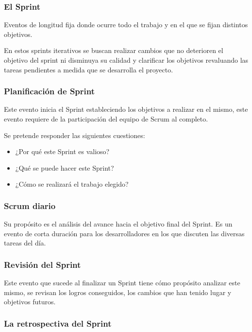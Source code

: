 \subsubsection{El Sprint}

Eventos de longitud fija donde ocurre todo el trabajo y en el que se fijan distintos objetivos.

En estos sprints iterativos se buscan realizar cambios que no deterioren el objetivo del sprint ni disminuya su calidad y clarificar los objetivos revaluando las tareas pendientes a medida que se desarrolla el proyecto.

\subsubsection{Planificación de Sprint}

Este evento inicia el Sprint estableciendo los objetivos a realizar en el mismo, este evento requiere de la participación del equipo de Scrum al completo.

Se pretende responder las siguientes cuestiones:

\begin{itemize}

    \item ¿Por qué este Sprint es valioso?
    \item ¿Qué se puede hacer este Sprint?
    \item ¿Cómo se realizará el trabajo elegido?

\end{itemize}

\subsubsection{Scrum diario}

Su propósito es el análisis del avance hacia el objetivo final del Sprint.
Es un evento de corta duración para los desarrolladores en los que discuten las diversas tareas del día.

\subsubsection{Revisión del Sprint}

Este evento que sucede al finalizar un Sprint tiene cómo propósito analizar este mismo, se revisan los logros conseguidos, los cambios que han tenido lugar y objetivos futuros.

\subsubsection{La retrospectiva del Sprint}

